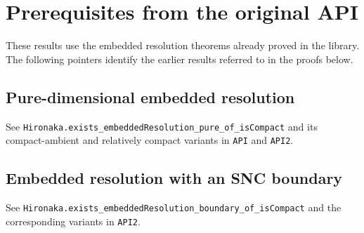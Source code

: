 \documentclass[11pt,a4paper]{article}
\theoremstyle{definition}
\begin{document}
\section{Prerequisites from the original API}
These results use the embedded resolution theorems already proved in the library.
The following pointers identify the earlier results referred to in the proofs below.
\subsection{Pure-dimensional embedded resolution}\label{hir:embedded-resolution-pure-dimensional}
See \texttt{Hironaka.exists\_embeddedResolution\_pure\_of\_isCompact} and its compact-ambient and relatively compact variants in \texttt{API} and \texttt{API2}.
\subsection{Embedded resolution with an SNC boundary}\label{hir:embedded-resolution-boundary}
See \texttt{Hironaka.exists\_embeddedResolution\_boundary\_of\_isCompact} and the corresponding variants in \texttt{API2}.
\end{document}
